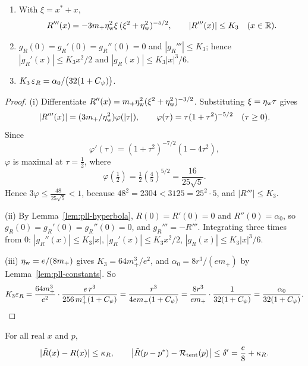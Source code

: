 \begin{lemma}\label{lem:pll-taylor}
\begin{enumerate}[label=(\roman*)]
\item With $\xi=x^*+x$,
 \[
  R'''(x)=-3m_+\eta_{\rm w}^2\xi\,(\xi^2+\eta_{\rm w}^2)^{-5/2},\qquad |R'''(x)|\le K_3\quad(x\in\mathbb{R}).
 \]
\item $g_R(0)=g_R'(0)=g_R''(0)=0$ and $|g_R'''|\le K_3$; hence $|g_R'(x)|\le K_3x^2/2$ and
 $|g_R(x)|\le K_3|x|^3/6$.
\item $K_3\,\varepsilon_R=\alpha_0/\bigl(32(1+C_\psi)\bigr)$.
\end{enumerate}
\end{lemma}

\begin{proof}
(i) Differentiate $R''(x)=m_+\eta_{\rm w}^2(\xi^2+\eta_{\rm w}^2)^{-3/2}$. Substituting $\xi=\eta_{\rm w}\tau$ gives
\[
 |R'''(x)|=(3m_+/\eta_{\rm w}^2)\varphi(|\tau|),\qquad
 \varphi(\tau)=\tau(1+\tau^2)^{-5/2}\quad(\tau\ge0).
\]
Since
\[
 \varphi'(\tau)=(1+\tau^2)^{-7/2}(1-4\tau^2),
\]
$\varphi$ is maximal at $\tau=\frac12$, where
\[
 \varphi(\tfrac12)=\tfrac12(\tfrac45)^{5/2}=\frac{16}{25\sqrt5}.
\]
Hence $3\varphi\le\frac{48}{25\sqrt5}<1$, because
$48^2=2304<3125=25^2\cdot5$, and $|R'''|\le K_3$.

(ii) By Lemma~\ref{lem:pll-hyperbola}, $R(0)=R'(0)=0$ and $R''(0)=\alpha_0$, so $g_R(0)=g_R'(0)=g_R''(0)=0$, and
$g_R'''=-R'''$. Integrating three times from $0$: $|g_R''(x)|\le K_3|x|$, $|g_R'(x)|\le K_3x^2/2$,
$|g_R(x)|\le K_3|x|^3/6$.

(iii) $\eta_{\rm w}=e/(8m_+)$ gives $K_3=64m_+^3/e^2$, and $\alpha_0=8r^3/(em_+)$ by Lemma~\ref{lem:pll-constants}. So
\[
 K_3\varepsilon_R=\frac{64m_+^3}{e^2}\cdot\frac{e\,r^3}{256\,m_+^4(1+C_\psi)}=\frac{r^3}{4em_+(1+C_\psi)}
 =\frac{8r^3}{em_+}\cdot\frac1{32(1+C_\psi)}=\frac{\alpha_0}{32(1+C_\psi)} .\qedhere
\]
\end{proof}

\begin{lemma}[Closeness]\label{lem:pll-Rtilde-close}
For all real $x$ and $p$,
\begin{equation}\label{eq:pll-Rtilde-close}
 |\tilde R(x)-R(x)|\le\kappa_R,\qquad
 \bigl|\tilde R(p-p^*)-\mathcal{R}_{\rm tent}(p)\bigr|\le\delta'=\frac e8+\kappa_R .
\end{equation}
\end{lemma}

